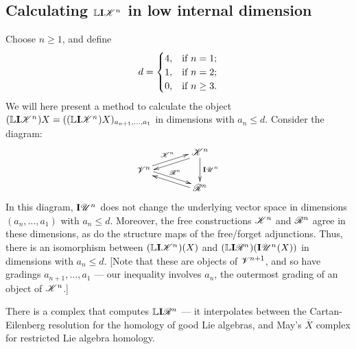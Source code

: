 \documentclass[11pt]{article}
\newcommand{\PRLie}[1]{\scrR^{#1}}%
\newcommand{\LL}[1]{{\scrK}^{#1}}%
\newcommand{\GR}[1]{\scrV^{#1}}%
\newcommand{\nontop}[1]{\scrU^{#1}}%
\newcommand{\Ind}[2][]{\mathbf{I}{#2}_{#1}}%
\newcommand{\forget}{\mathrm{fg}}
\newcommand{\Fr}[1]{#1}%
\newcommand{\derived}{\mathbb{L}}
\begin{document}
\begin{DerivedFunctorsLowDimension}
\subsection*{Calculating $\derived\Ind{\LL{n}}$ in low internal dimension}
Choose $n\geq 1$, and define 
\[d=\begin{cases}
4,&\textup{if }n=1;\\
1,&\textup{if }n=2;
\\0,&\textup{if }n\geq3.
\end{cases}
\]
We will here present a method to calculate the object $(\derived\Ind{\LL{n}})X=((\derived\Ind{\LL{n}})X)_{a_{n+1},\ldots,a_1}$ in dimensions with $a_n\leq d$. Consider the diagram:
\[\xymatrix@R=2mm@C=13mm{
&%
\ar[dd]^-{\Ind{\nontop{n}}}
\ar@<.5ex>[dl]%
\LL{n}\\%
\ar@<.5ex>[ur]^-{\LL{n}}
\ar@<.5ex>[dr]^-{\PRLie{n}}
\GR{n}&%
\\%
&%
\PRLie{n}
\ar@<.5ex>[ul]%
}\]
In this diagram, $\Ind{\nontop{n}}$ does not change the underlying vector space in dimensions $(a_n,\ldots,a_1)$ with $a_n\leq d$. Moreover, the free constructions $\Fr{\LL{n}}$ and $\Fr{\PRLie{n}}$ agree in these dimensions, as do the structure maps of the free/forget adjunctions. Thus, there is an isomorphism between $(\derived\Ind{\LL{n}})(X)$ and $(\derived\Ind{\PRLie{n}})(\Ind{\nontop{n}}(X))$ in dimensions with $a_n\leq d$. [Note that these are objects of $\GR{n+1}$, and so have gradings $a_{n+1},\ldots,a_1$ --- our inequality involves $a_n$, the outermost grading of an object of $\LL{n}$.]

There is a complex that computes $\derived\Ind{\PRLie{n}}$ --- it interpolates between the Cartan-Eilenberg resolution for the homology of good Lie algebras, and May's $\overline{X}$ complex for  restricted Lie algebra homology.
\end{DerivedFunctorsLowDimension}
\end{document}
